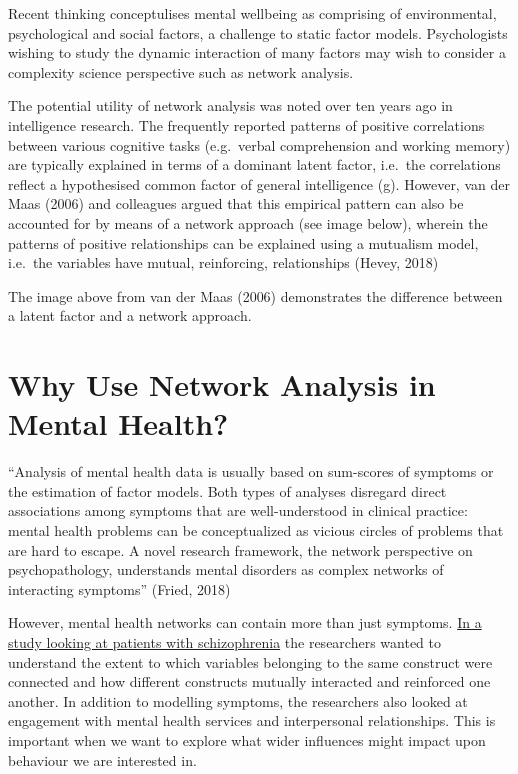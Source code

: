 \documentclass[]{book}
\begin{document}
Recent thinking conceptulises mental wellbeing as comprising of environmental, psychological and social factors, a challenge to static factor models. Psychologists wishing to study the dynamic interaction of many factors may wish to consider a complexity science perspective such as network analysis.

The potential utility of network analysis was noted over ten years ago in intelligence research. The frequently reported patterns of positive correlations between various cognitive tasks (e.g.~verbal comprehension and working memory) are typically explained in terms of a dominant latent factor, i.e.~the correlations reflect a hypothesised common factor of general intelligence (g). However, van der Maas (2006) and colleagues argued that this empirical pattern can also be accounted for by means of a network approach (see image below), wherein the patterns of positive relationships can be explained using a mutualism model, i.e.~the variables have mutual, reinforcing, relationships (Hevey, 2018)

The image above from van der Maas (2006) demonstrates the difference between a latent factor and a network approach.

\hypertarget{why-use-network-analysis-in-mental-health}{%
\section{Why Use Network Analysis in Mental Health?}\label{why-use-network-analysis-in-mental-health}}

``Analysis of mental health data is usually based on sum-scores of symptoms or the estimation of factor models. Both types of analyses disregard direct associations among symptoms that are well-understood in clinical practice: mental health problems can be conceptualized as vicious circles of problems that are hard to escape. A novel research framework, the network perspective on psychopathology, understands mental disorders as complex networks of interacting symptoms'' (Fried, 2018)

However, mental health networks can contain more than just symptoms. \href{https://jamanetwork.com/journals/jamapsychiatry/fullarticle/2671414?casa_token=nGUSw-yIg1YAAAAA\%3aXJz4Ehq44lBBE3iDqQhuNSGgJfafMX9lGyiDx9YxHJpVSFVOJo0gkA0NdrEGhY9T-6mvlB17}{In a study looking at patients with schizophrenia} the researchers wanted to understand the extent to which variables belonging to the same construct were connected and how different constructs mutually interacted and reinforced one another. In addition to modelling symptoms, the researchers also looked at engagement with mental health services and interpersonal relationships. This is important when we want to explore what wider influences might impact upon behaviour we are interested in.
\end{document}

